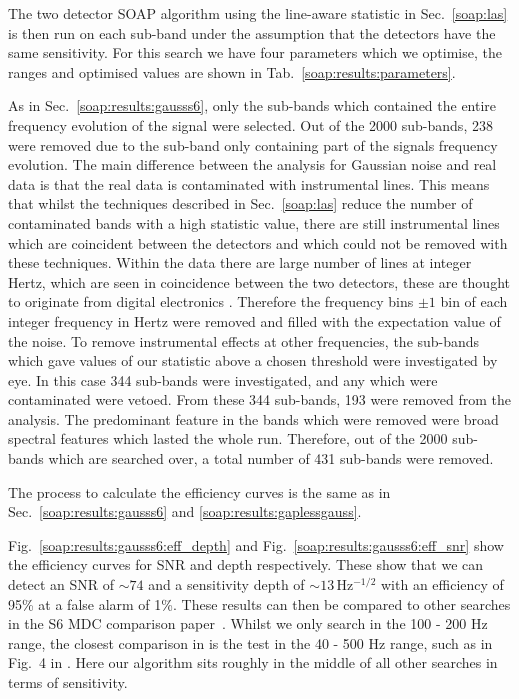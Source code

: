 The two detector SOAP algorithm using the line-aware statistic in Sec.~\ref{soap:las} is then run on each sub-band under the assumption that the detectors have the same sensitivity.
For this search we have four parameters which we optimise, the ranges and optimised values are shown in Tab.~\ref{soap:results:parameters}.

%
%
As in Sec.~\ref{soap:results:gausss6}, only the sub-bands which contained the entire frequency evolution of the signal were selected.
Out of the 2000 sub-bands, 238 were removed due to the sub-band only containing part of the signals frequency evolution.
The main difference between the analysis for Gaussian noise and real data is that
the real data is contaminated with instrumental lines. This means that whilst the techniques described in Sec.~\ref{soap:las} reduce the number of contaminated bands with a high statistic value, there are still
instrumental lines which are coincident between the detectors and which could not be removed
with these techniques. Within the data there are large number of lines at integer Hertz, which are seen in coincidence between the two detectors, these are thought to originate from digital electronics \citep{coughlin2010NoiseLine}. Therefore the frequency bins $\pm1$ bin of each integer frequency in
Hertz were removed and filled with the expectation value of the noise. To remove instrumental effects at other frequencies,
the sub-bands which gave values of our
statistic above a chosen threshold were investigated by eye. In this case 344 sub-bands were
investigated, and any which were contaminated were vetoed. 
From these 344 sub-bands, 193 were removed from the analysis. The predominant feature in the bands which were removed were broad spectral features which lasted the whole run. Therefore, out of the 2000 sub-bands which are searched over, a total number of 431 sub-bands were removed.

%
%
The process to calculate the efficiency curves is the same as
in Sec.~\ref{soap:results:gausss6} and \ref{soap:results:gaplessgauss}.

%
%

Fig.~\ref{soap:results:gausss6:eff_depth} and Fig.~\ref{soap:results:gausss6:eff_snr} show the efficiency curves
for \gls{SNR} and depth respectively.  These show that we can detect an
\gls{SNR} of $\sim 74$ and a sensitivity depth of $\sim 13$\,Hz$^{-1/2}$ with
an efficiency of 95\% at a false alarm of 1\%. These results can then be compared to other searches in the S6 MDC comparison paper~\citep{walsh2016ComparisonMethods}. Whilst we only search in the 100 - 200 Hz range, the closest comparison in \citep{walsh2016ComparisonMethods} is the test in the 40 - 500 Hz range, such as in Fig.~4 in \citep{walsh2016ComparisonMethods}. Here our algorithm sits roughly in the middle of all other searches in terms of sensitivity.

